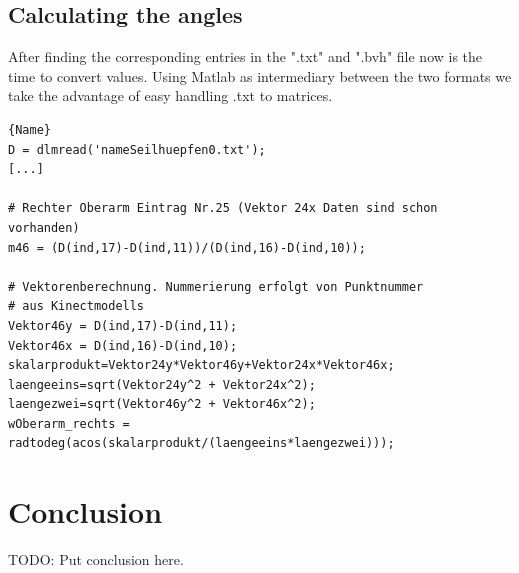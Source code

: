 \documentclass[a4paper]{article}
\begin{document}
\subsection{Calculating the angles}
After finding the corresponding entries in the ".txt" and ".bvh" file now is the time to convert values. Using Matlab as  intermediary between the two formats we take the advantage of easy handling .txt to matrices.

\begin{lstlisting}[caption=Calculating the angle]{Name}
D = dlmread('nameSeilhuepfen0.txt');
[...]

# Rechter Oberarm Eintrag Nr.25 (Vektor 24x Daten sind schon vorhanden)
m46 = (D(ind,17)-D(ind,11))/(D(ind,16)-D(ind,10));

# Vektorenberechnung. Nummerierung erfolgt von Punktnummer 
# aus Kinectmodells
Vektor46y = D(ind,17)-D(ind,11);
Vektor46x = D(ind,16)-D(ind,10);
skalarprodukt=Vektor24y*Vektor46y+Vektor24x*Vektor46x;
laengeeins=sqrt(Vektor24y^2 + Vektor24x^2);
laengezwei=sqrt(Vektor46y^2 + Vektor46x^2); 
wOberarm_rechts = radtodeg(acos(skalarprodukt/(laengeeins*laengezwei)));
\end{lstlisting}


\section{Conclusion}

TODO: Put conclusion here.

\newpage

\end{document}
